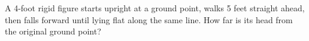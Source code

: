 A 4-foot rigid figure starts upright at a ground point, walks 5 feet straight ahead, then falls forward until lying flat along the same line. How far is its head from the original ground point?
